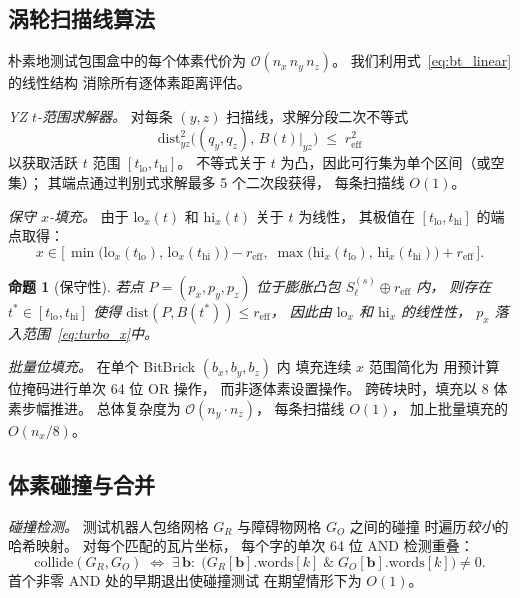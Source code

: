 \documentclass[journal]{IEEEtran}
\newtheorem{proposition}{命题}
\newcommand{\calO}{\mathcal{O}}
\begin{document}
\subsection{涡轮扫描线算法}\label{sec:turbo}

朴素地测试包围盒中的每个体素代价为
$\calO(n_x\,n_y\,n_z)$。
我们利用式~\eqref{eq:bt_linear}的线性结构
消除所有逐体素距离评估。

\emph{YZ $t$-范围求解器。}
对每条 $(y,z)$ 扫描线，求解分段二次不等式
\begin{equation}\label{eq:yz_ineq}
  \mathrm{dist}^2_{yz}\!\bigl((q_y,q_z),\, B(t)|_{yz}\bigr) \;\le\; r_{\text{eff}}^2
\end{equation}
以获取活跃 $t$ 范围 $[t_{\mathrm{lo}}, t_{\mathrm{hi}}]$。
不等式关于 $t$ 为凸，因此可行集为单个区间（或空集）；
其端点通过判别式求解最多 5 个二次段获得，
每条扫描线 $O(1)$。

\emph{保守 $x$-填充。}
由于 $\mathrm{lo}_x(t)$ 和 $\mathrm{hi}_x(t)$ 关于 $t$ 为线性，
其极值在 $[t_{\mathrm{lo}}, t_{\mathrm{hi}}]$ 的端点取得：
\begin{equation}\label{eq:turbo_x}
  x \in \bigl[\,
    \min\!\bigl(\mathrm{lo}_x(t_{\mathrm{lo}}),\,\mathrm{lo}_x(t_{\mathrm{hi}})\bigr) - r_{\text{eff}},\;
    \max\!\bigl(\mathrm{hi}_x(t_{\mathrm{lo}}),\,\mathrm{hi}_x(t_{\mathrm{hi}})\bigr) + r_{\text{eff}}
  \,\bigr].
\end{equation}

\begin{proposition}[保守性]\label{prop:turbo_conserv}
若点 $P{=}(p_x,p_y,p_z)$ 位于膨胀凸包
$S_\ell^{(s)} \oplus r_{\text{eff}}$ 内，
则存在 $t^* \in [t_{\mathrm{lo}},t_{\mathrm{hi}}]$
使得 $\mathrm{dist}(P,B(t^*)) \le r_{\text{eff}}$，
因此由 $\mathrm{lo}_x$ 和 $\mathrm{hi}_x$ 的线性性，
$p_x$ 落入范围~\eqref{eq:turbo_x}中。
\end{proposition}

\emph{批量位填充。}
在单个 BitBrick $(b_x, b_y, b_z)$ 内
填充连续 $x$ 范围简化为
用预计算位掩码进行单次 64 位 OR 操作，
而非逐体素设置操作。
跨砖块时，填充以 8 体素步幅推进。
总体复杂度为 $\calO(n_y \cdot n_z)$，
每条扫描线 $O(1)$，
加上批量填充的 $O(n_x/8)$。

\subsection{体素碰撞与合并}\label{sec:voxel_ops}

\emph{碰撞检测。}
测试机器人包络网格 $G_R$ 与障碍物网格 $G_O$ 之间的碰撞
时遍历\emph{较小}的哈希映射。
对每个匹配的瓦片坐标，
每个字的单次 64 位 AND 检测重叠：
\begin{equation}
  \text{collide}(G_R, G_O) \;\Leftrightarrow\;
  \exists\, \bm{b}:\;
  \bigl(G_R[\bm{b}].\mathrm{words}[k]
  \;\mathbin{\&}\; G_O[\bm{b}].\mathrm{words}[k]\bigr) \ne 0.
\end{equation}
首个非零 AND 处的早期退出使碰撞测试
在期望情形下为 $O(1)$。
\end{document}
